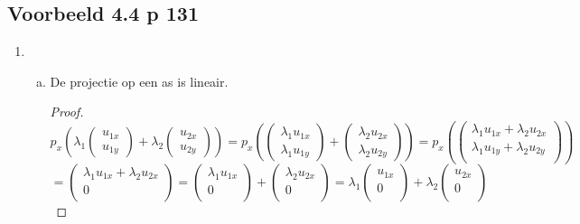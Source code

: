 \documentclass[lineaire_algebra_oplossingen.tex]{subfiles}
\begin{document}
\subsection{Voorbeeld 4.4 p 131}
\begin{enumerate}
\item
\begin{enumerate}[a)]
\item De projectie op een as is lineair.
\begin{proof}
\[
p_x \left(\lambda_1
\begin{pmatrix}
u_{1x}\\u_{1y}
\end{pmatrix} 
+ \lambda_2
\begin{pmatrix}
u_{2x}\\u_{2y}
\end{pmatrix} \right)
 = 
p_x \left(
\begin{pmatrix}
\lambda_1u_{1x}\\\lambda_1u_{1y}
\end{pmatrix} 
+ 
\begin{pmatrix}
\lambda_2u_{2x}\\\lambda_2u_{2y}
\end{pmatrix} \right)
=
p_x \left(
\begin{pmatrix}
\lambda_1u_{1x}+\lambda_2u_{2x}\\\lambda_1u_{1y}+\lambda_2u_{2y}\\
\end{pmatrix} \right)
\]
\[
= 
\begin{pmatrix}
\lambda_1u_{1x}+\lambda_2u_{2x}\\0\\
\end{pmatrix}
=
\begin{pmatrix}
\lambda_1u_{1x}\\0\\
\end{pmatrix}
+
\begin{pmatrix}
\lambda_2u_{2x}\\0\\
\end{pmatrix}
=
\lambda_1
\begin{pmatrix}
u_{1x}\\0\\
\end{pmatrix}
+
\lambda_2
\begin{pmatrix}
u_{2x}\\0\\
\end{pmatrix}
\]
\end{proof}
\end{enumerate}
\end{enumerate}
\end{document}
